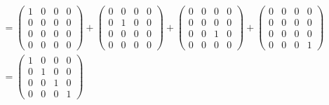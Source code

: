 \documentclass[12pt]{extarticle}
\begin{document}
\begin{multline*}
= \begin{pmatrix} 1 & 0 & 0 & 0 \\ 0 & 0 & 0 & 0 \\ 0 & 0 & 0 & 0 \\ 0 & 0 & 0 & 0 \end{pmatrix} + \begin{pmatrix} 0 & 0 & 0 & 0 \\ 0 & 1 & 0 & 0 \\ 0 & 0 & 0 & 0 \\ 0 & 0 & 0 & 0 \end{pmatrix} + \begin{pmatrix} 0 & 0 & 0 & 0 \\ 0 & 0 & 0 & 0 \\ 0 & 0 & 1 & 0 \\ 0 & 0 & 0 & 0 \end{pmatrix} + \begin{pmatrix} 0 & 0 & 0 & 0 \\ 0 & 0 & 0 & 0 \\ 0 & 0 & 0 & 0 \\ 0 & 0 & 0 & 1 \end{pmatrix} \\
= \begin{pmatrix} 1 & 0 & 0 & 0 \\ 0 & 1 & 0 & 0 \\ 0 & 0 & 1 & 0 \\ 0 & 0 & 0 & 1 \end{pmatrix} \\
\end{multline*}

\printbibliography
\end{document}
